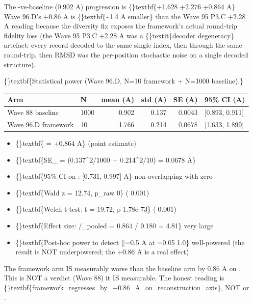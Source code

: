 \documentclass{article}
\begin{document}
The -vs-baseline (0.902 A) progression is \{\}textbf\{+1.628  +2.276  +0.864 A\}  Wave 96.D's +0.86 A is \{\}textbf\{\textasciitilde{}1.4 A smaller\} than the Wave 95 P3.C +2.28 A reading because the diversity fix exposes the framework's actual round-trip fidelity loss (the Wave 95 P3.C +2.28 A was a \{\}textit\{decoder degeneracy\} artefact: every record decoded to the same single index, then through the same round-trip, then RMSD was the per-position stochastic noise on a single decoded structure).

\{\}textbf\{Statistical power (Wave 96.D, N=10 framework + N=1000 baseline).\}

\begin{table}[ht]
\centering
\small
\begin{tabular}{llrrrl}
\hline
\textbf{Arm} & \textbf{N} & \textbf{mean (A)} & \textbf{std (A)} & \textbf{SE (A)} & \textbf{95\% CI (A)} \\
\hline
Wave 88 baseline & 1000 & 0.902 & 0.137 & 0.0043 & [0.893, 0.911] \\
Wave 96.D framework & 10 & 1.766 & 0.214 & 0.0678 & [1.633, 1.899] \\
\hline
\end{tabular}
\end{table}

\begin{itemize}
\item \{\}textbf\{ = +0.864 A\} (point estimate)
\item \{\}textbf\{SE\_ = (0.137\textasciicircum{}2/1000 + 0.214\textasciicircum{}2/10) = 0.0678 A\}
\item \{\}textbf\{95\% CI on : [0.731, 0.997] A\}  non-overlapping with zero
\item \{\}textbf\{Wald z = 12.74, p\_raw  0\} ( 0.001)
\item \{\}textbf\{Welch t-test: t = 19.72, p  1.78e-73\} ( 0.001)
\item \{\}textbf\{Effect size: /\_pooled = 0.864 / 0.180 = 4.81\}  very large
\item \{\}textbf\{Post-hoc power to detect ||=0.5 A at =0.05  1.0\}  well-powered (the result is NOT underpowered; the +0.86 A is a real effect)
\end{itemize}
The framework arm IS measurably worse than the baseline arm by 0.86 A on . This is NOT a  verdict (Wave 88)  it IS measurable. The honest reading is \{\}textbf\{framework\_regresses\_by\_+0.86\_A\_on\_reconstruction\_axis\}, NOT  or .
\end{document}
